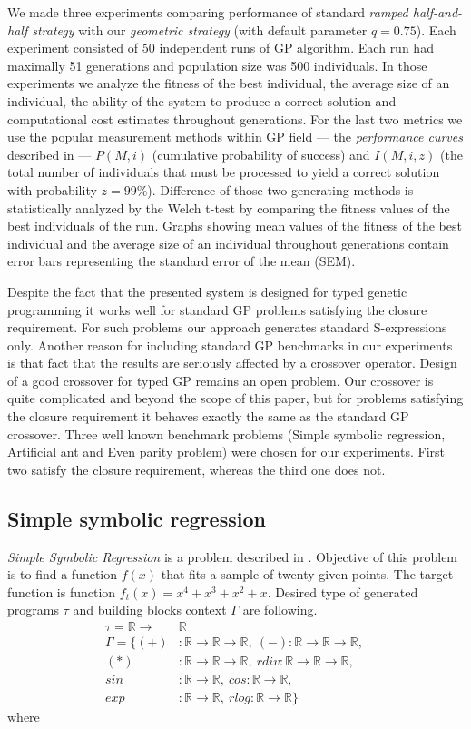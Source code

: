 \documentclass[conference]{IEEEtran}
\newcommand{\ar}{\rightarrow\xspace}
\newcommand{\Real}{\mathbb{R}}
\begin{document}
We made three experiments comparing performance of standard 
\textit{ramped half-and-half strategy} with our
\textit{geometric strategy} (with default parameter $q=0.75$). 
Each experiment consisted of 50 independent runs 
of GP algorithm. Each run had maximally 51 generations and population size
was 500 individuals.
In those experiments we analyze the fitness of the best individual,
the average size of an individual,
the ability of the system to produce a correct solution 
and computational cost estimates throughout generations. 
For the last two metrics we use the popular measurement  
methods within GP field --- the \textit{performance curves}
described in \cite{koza92} --- $P(M,i)$ (cumulative probability of success) 
and $I(M,i,z)$ (the total number of individuals that must be processed 
to yield a correct solution with probability $z =99\%$).
Difference of those two generating methods 
is statistically analyzed by the Welch t-test
by comparing the fitness values of the best individuals of the run. 
Graphs showing mean values of the fitness of the best individual and
the average size of an individual throughout generations
contain error bars representing the standard error of the mean (SEM).

Despite the fact that the presented system is designed
for typed genetic programming it works well for
standard GP problems satisfying the closure requirement. For such problems our approach 
generates standard S-expressions only. 
Another reason for including standard GP
benchmarks in our experiments is that fact that
the results are seriously affected by a crossover 
operator. Design of a good crossover for typed GP
remains an open problem. 
Our crossover is quite complicated and beyond
the scope of this paper, but for problems satisfying
the closure requirement it behaves exactly the same
as the standard GP crossover. 
Three well known benchmark problems
(Simple symbolic regression, Artificial ant and
Even parity problem) were chosen for our experiments.
First two satisfy the closure requirement, 
whereas the third one does not.

\subsection{Simple symbolic regression}
\textit{Simple Symbolic Regression} is a problem described
in \cite{koza92}. Objective of this problem is to 
find a function $f(x)$ that fits a sample
of twenty given points. The target function is 
function $f_{t}(x) = x^4 + x^3 + x^2 + x$.  
Desired type of generated programs $\tau$ and 
building blocks context $\Gamma$ are following.
\begin{align*}
\tau = \Real \ar &\Real\\
\Gamma = \{
  (+)  &: \Real \ar \Real \ar \Real    ,~ 
  (-)   : \Real \ar \Real \ar \Real    ,~\\
  (*)  &: \Real \ar \Real \ar \Real    ,~ 
  rdiv  : \Real \ar \Real \ar \Real    ,~\\
  sin  &: \Real \ar \Real              ,~ 
  cos   : \Real \ar \Real              ,~\\
  exp  &: \Real \ar \Real              ,~ 
  rlog  : \Real \ar \Real              \}
\end{align*}
where
\end{document}
